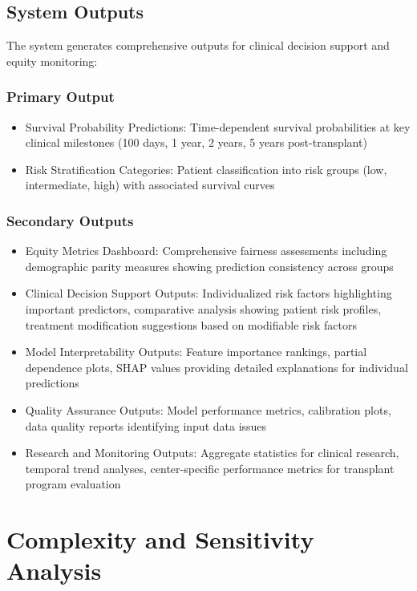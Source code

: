 \subsection{System Outputs}

The system generates comprehensive outputs for clinical decision support and equity monitoring:

\subsubsection{Primary Output}
\begin{itemize}
    \item Survival Probability Predictions: Time-dependent survival probabilities at key clinical milestones (100 days, 1 year, 2 years, 5 years post-transplant)
    \item Risk Stratification Categories: Patient classification into risk groups (low, intermediate, high) with associated survival curves
\end{itemize}

\subsubsection{Secondary Outputs}
\begin{itemize}
    \item Equity Metrics Dashboard: Comprehensive fairness assessments including demographic parity measures showing prediction consistency across groups
    \item Clinical Decision Support Outputs: Individualized risk factors highlighting important predictors, comparative analysis showing patient risk profiles, treatment modification suggestions based on modifiable risk factors
    \item Model Interpretability Outputs: Feature importance rankings, partial dependence plots, SHAP values providing detailed explanations for individual predictions
    \item Quality Assurance Outputs: Model performance metrics, calibration plots, data quality reports identifying input data issues
    \item Research and Monitoring Outputs: Aggregate statistics for clinical research, temporal trend analyses, center-specific performance metrics for transplant program evaluation
\end{itemize}

\section{Complexity and Sensitivity Analysis}


